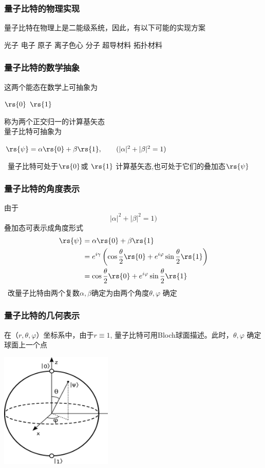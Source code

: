 \begin{frame} 
    \frametitle{量子比特的物理实现}
    量子比特在物理上是二能级系统，因此，有以下可能的实现方案\\
    \begin{enumerate}
        \Item   光子
        \Item   电子
        \Item   原子
        \Item   离子色心
        \Item   分子
        \Item   超导材料
        \Item   拓扑材料
    \end{enumerate}
\end{frame}

\begin{frame} 
    \frametitle{量子比特的数学抽象}   
    这两个能态在数学上可抽象为
    \begin{enumerate}
        \Item   $\rs{0}$
        \Item   $\rs{1}$
    \end{enumerate}
    称为两个正交归一的计算基矢态\\
    量子比特可抽象为
    \begin{enumerate}
        \Item   $\rs{\psi} =\alpha\rs{0}+\beta\rs{1}, \qquad (|\alpha|^2+|\beta|^2=1)$
    \end{enumerate}
    \Note~量子比特可处于$\rs{0}$或 $\rs{1}$ 计算基矢态,也可处于它们的叠加态$\rs{\psi}$
\end{frame}

\begin{frame} 
    \frametitle{量子比特的角度表示} 
  由于\[|\alpha|^2+|\beta|^2=1)\]
  叠加态可表示成角度形式  
  \[\begin{aligned}
    \rs{\psi} &=\alpha\rs{0}+\beta\rs{1} \\
    &=e^{i\gamma} \left(\cos\frac{\theta}{2}\rs{0}+e^{i\varphi} \sin\frac{\theta}{2}\rs{1}\right) \\
    &=\cos\frac{\theta}{2}\rs{0}+e^{i\varphi} \sin\frac{\theta}{2}\rs{1}
  \end{aligned}\]
  \Note~改量子比特由两个复数$\alpha,\beta$确定为由两个角度$\theta, \varphi$ 确定
\end{frame}

\begin{frame} 
    \frametitle{量子比特的几何表示} 
  在（$r,\theta,\varphi$）坐标系中，由于$r\equiv 1$, 量子比特可用Bloch球面描述。此时，$\theta, \varphi$ 确定球面上一个点
  \begin{center}
    \includegraphics[width=0.4\textwidth]{figs/8.png}
\end{center} 
\end{frame}

